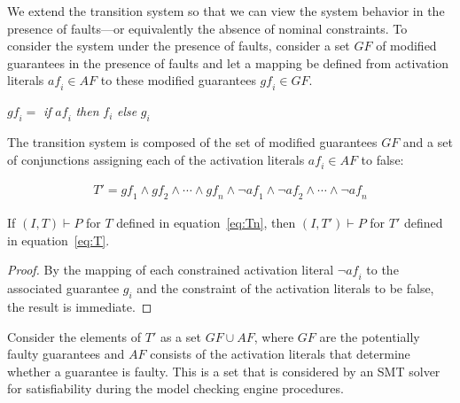 
We extend the transition system so that we can view the system behavior in the presence of faults---or equivalently the absence of nominal constraints. To consider the system under the presence of faults, consider a set $GF$ of modified guarantees in the presence of faults and let a mapping be defined from activation literals $\mathit{af_i} \in AF$ to these modified guarantees $\mathit{gf_i} \in GF$. 
\begin{center}
$\mathit{gf_i} =$ \textit{if} $\mathit{af_i}$ \textit{then} $f_i$ \textit{else} $g_i$
\label{eq:sigma}
\end{center}

The transition system is composed of the set of modified guarantees $GF$ and a set of conjunctions assigning each of the activation literals $\mathit{af_i} \in AF$ to false: 

\begin{gather}
T' = \mathit{gf_1} \land \mathit{gf_2} \land \cdots \land \mathit{gf_n} \land \neg \mathit{af_1} \land \neg \mathit{af_2} \land \cdots \land \neg \mathit{af_n}
\label{eq:T}
\end{gather}

\begin{theorem} If $(I,T) \vdash P$ for $T$ defined in equation~\ref{eq:Tn}, then $(I,T') \vdash P$ for $T'$ defined in equation~\ref{eq:T}.
\begin{proof}
By the mapping of each constrained activation literal $\neg \mathit{af_i}$ to the associated guarantee $g_i$ and the constraint of the activation literals to be false, the result is immediate.
\end{proof}
\end{theorem}

Consider the elements of $T'$ as a set $GF \cup AF$, where $GF$ are the potentially faulty guarantees and $AF$ consists of the activation literals that determine whether a guarantee is faulty. This is a set that is considered by an SMT solver for satisfiability during the model checking engine procedures. 

